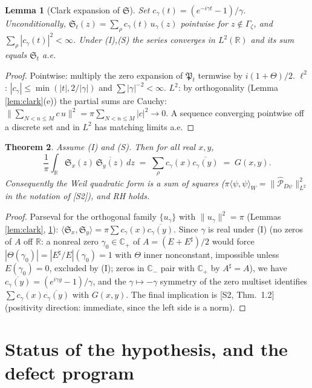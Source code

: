 \documentclass[11pt]{article}
\newtheorem{theorem}{Theorem}
\newtheorem{lemma}[theorem]{Lemma}
\newcommand{\C}{\mathbb{C}}
\newcommand{\R}{\mathbb{R}}
\newcommand{\Hp}{\C_{+}}
\newcommand{\Th}{\Theta}
\newcommand{\Sfr}{\mathfrak{S}}
\newcommand{\Pfr}{\mathfrak{P}}
\begin{document}
\begin{lemma}[Clark expansion of $\Sfr$]\label{lem:exp}
Set $c_\gamma(t)=(e^{-i\gamma t}-1)/\gamma$. Unconditionally,
$\Sfr_t(z)=\sum_\rho c_\gamma(t)\,u_\gamma(z)$ pointwise for $z\notin\Gamma_\zeta$,
and $\sum_\rho|c_\gamma(t)|^2<\infty$. Under (I),(S) the series converges in
$L^2(\R)$ and its sum equals $\Sfr_t$ a.e.
\end{lemma}

\begin{proof}
Pointwise: multiply the zero expansion of $\Pfr_t$ termwise by $i(1+\Th)/2$.
$\ell^2$: $|c_\gamma|\le\min(|t|,2/|\gamma|)$ and $\sum|\gamma|^{-2}<\infty$.
$L^2$: by orthogonality (Lemma \ref{lem:clark}(e)) the partial sums are Cauchy:
$\|\sum_{N<n\le M}c\,u\|^2=\pi\sum_{N<n\le M}|c|^2\to0$. A sequence converging
pointwise off a discrete set and in $L^2$ has matching limits a.e.
\end{proof}

\begin{theorem}\label{thm:main}
Assume (I) and (S). Then for all real $x,y$,
\[ \frac1\pi\int_\R \Sfr_x(z)\,\overline{\Sfr_y(z)}\,dz \;=\;
\sum_{\rho}c_\gamma(x)\overline{c_\gamma(y)} \;=\; G(x,y). \]
Consequently the Weil quadratic form is a sum of squares
($\pi\langle\psi,\psi\rangle_W=\|\widehat{\mathcal P}_{D\psi}\|_{L^2}^2$ in the
notation of [S2]), and RH holds.
\end{theorem}

\begin{proof}
Parseval for the orthogonal family $\{u_\gamma\}$ with $\|u_\gamma\|^2=\pi$
(Lemmas \ref{lem:clark}, \ref{lem:exp}):
$\langle\Sfr_x,\Sfr_y\rangle=\pi\sum c_\gamma(x)\overline{c_\gamma(y)}$.
Since $\gamma$ is real under (I) (no zeros of $A$ off $\R$: a nonreal zero
$\gamma_0\in\Hp$ of $A=(E+E^\sharp)/2$ would force
$|\Th(\gamma_0)|=|E^\sharp/E|(\gamma_0)=1$ with $\Th$ inner nonconstant,
impossible unless $E(\gamma_0)=0$, excluded by (I); zeros in $\C_-$ pair with
$\Hp$ by $A^\sharp=A$), we have
$\overline{c_\gamma(y)}=(e^{i\gamma y}-1)/\gamma$, and the $\gamma\mapsto-\gamma$
symmetry of the zero multiset identifies
$\sum c_\gamma(x)\overline{c_\gamma(y)}$ with $G(x,y)$. The final implication
is [S2, Thm.~1.2] (positivity direction: immediate, since the left side is a
norm).
\end{proof}

\section{Status of the hypothesis, and the defect program}
\end{document}
